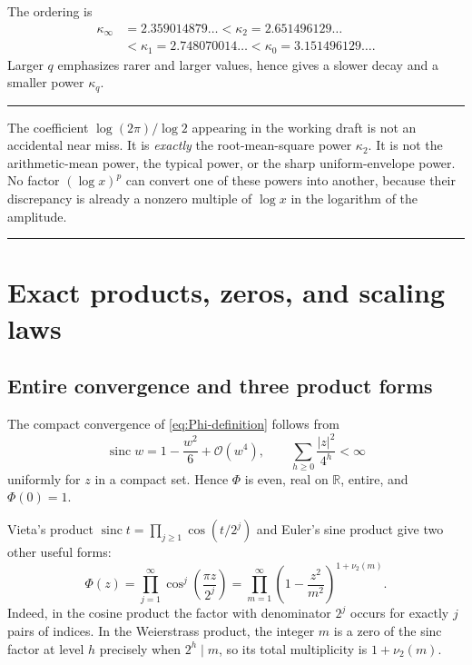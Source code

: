 \documentclass[11pt,oneside]{article}
\theoremstyle{definition}
\theoremstyle{remark}
\newcommand{\R}{\mathbb R}
\newcommand{\sinc}{\operatorname{sinc}}
\newcommand{\Phiup}{\Phi}
\newcommand{\bigO}{\mathcal O}
\newcommand{\vtwo}{\nu_2}
\newcommand{\abs}[1]{\left|#1\right|}
\newenvironment{boxedremark}{%
  \par\smallskip\noindent\begin{center}\begin{minipage}{0.94\textwidth}%
  \color{black}\hrule\vspace{0.6em}\small
}{%
  \vspace{0.6em}\hrule\end{minipage}\end{center}\smallskip
}
\begin{document}
The ordering is
\begin{equation}
 \begin{aligned}
 \kappa_\infty&=2.359014879\ldots<\kappa_2=2.651496129\ldots\\
 &<\kappa_1=2.748070014\ldots<\kappa_0=3.151496129\ldots .
 \end{aligned}
 \label{eq:kappa-order}
\end{equation}
Larger $q$ emphasizes rarer and larger values, hence gives a slower decay and a smaller
power $\kappa_q$.

\begin{boxedremark}
The coefficient $\log(2\pi)/\log2$ appearing in the working draft is not an accidental
near miss.  It is \emph{exactly} the root-mean-square power $\kappa_2$.  It is not the
arithmetic-mean power, the typical power, or the sharp uniform-envelope power.  No factor
$(\log x)^p$ can convert one of these powers into another, because their discrepancy is
already a nonzero multiple of $\log x$ in the logarithm of the amplitude.
\end{boxedremark}

\section{Exact products, zeros, and scaling laws}
\label{sec:exact-products}

\subsection{Entire convergence and three product forms}

The compact convergence of \eqref{eq:Phi-definition} follows from
\[
 \sinc w=1-\frac{w^2}{6}+\bigO(w^4),
 \qquad
 \sum_{h\ge0}\frac{\abs z^2}{4^h}<\infty
\]
uniformly for $z$ in a compact set.  Hence $\Phiup$ is even, real on $\R$, entire, and
$\Phiup(0)=1$.

Vieta's product $\sinc t=\prod_{j\ge1}\cos(t/2^j)$ and Euler's sine product give two other
useful forms:
\begin{equation}
 \Phiup(z)
 =\prod_{j=1}^{\infty}\cos^j\!\left(\frac{\pi z}{2^j}\right)
 =\prod_{m=1}^{\infty}
   \left(1-\frac{z^2}{m^2}\right)^{1+\vtwo(m)}.
 \label{eq:three-products}
\end{equation}
Indeed, in the cosine product the factor with denominator $2^j$ occurs for exactly $j$
pairs of indices.  In the Weierstrass product, the integer $m$ is a zero of the sinc factor
at level $h$ precisely when $2^h\mid m$, so its total multiplicity is $1+\vtwo(m)$.
\end{document}
